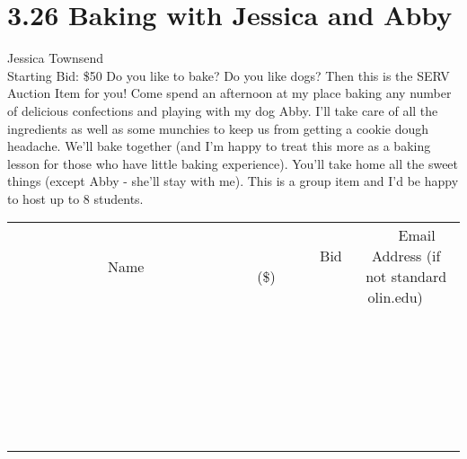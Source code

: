 \documentclass[11pt]{article}
\begin{document}
\section*{3.26 Baking with Jessica and Abby}
Jessica Townsend
\\
Starting Bid: \$50
\newline
Do you like to bake? Do you like dogs? Then this is the SERV Auction Item for you! Come spend an afternoon at my place baking any number of delicious confections and playing with my dog Abby. I'll take care of all the ingredients as well as some munchies to keep us from getting a cookie dough headache. We'll bake together (and I'm happy to treat this more as a baking lesson for those who have little baking experience). You'll take home all the sweet things (except Abby - she'll stay with me). This is a group item and I'd be happy to host up to 8 students.
\\[6ex]
\begin{tabular}{c c c}
~~~~~~~~~~~~~Name~~~~~~~~~~~~~ & ~~~~~~~~~Bid (\$)~~~~~~~~~  & ~~~Email Address (if not standard olin.edu)~~~\\
 & & \\
\hline
 & & \\
\hline
 & & \\
\hline
 & & \\
\hline
 & & \\
\hline
 & & \\
\hline
 & & \\
\hline
 & & \\
\hline
 & & \\
\hline
 & & \\
\hline
 & & \\
\hline
 & & \\
\hline
 & & \\
\hline
 & & \\
\hline
 & & \\
\hline
 & & \\
\hline
 & & \\
\hline
 & & \\
\hline
 & & \\
\hline
 & & \\
\hline
 & & \\
\hline
 & & \\
\hline
 & & \\
\hline
 & & \\
\hline
 & & \\
\hline
 & & \\
\hline
\end{tabular}
\newpage
\end{document}
